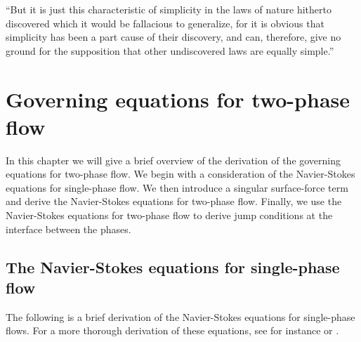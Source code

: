 \documentclass[11pt,b5paper,DIV=calc,BCOR1.3cm,headings=small,%
               footinclude=false,headsepline]{scrbook}
\begin{document}
\begin{savequote}[8.4cm]
  ``But it is just this characteristic of simplicity in the laws of nature
  hitherto discovered which it would be fallacious to generalize, for it is
  obvious that simplicity has been a part cause of their discovery, and can,
  therefore, give no ground for the supposition that other undiscovered laws
  are equally simple.''
\end{savequote}
\chapter{Governing equations for two-phase flow}
\label{chap:two-phase-flow}
In this chapter we will give a brief overview of the derivation of the
governing equations for two-phase flow.  We begin with a consideration of the
Navier-Stokes equations for single-phase flow.  We then introduce a singular
surface-force term and derive the Navier-Stokes equations for two-phase flow.
Finally, we use the Navier-Stokes equations for two-phase flow to derive jump
conditions at the interface between the phases.

\section{The Navier-Stokes equations for single-phase flow}
The following is a brief derivation of the Navier-Stokes equations for
single-phase flows.  For a more thorough derivation of these equations, see for
instance \citet[§4 and §5]{Aris89} or \citet[Chapter~4]{White03}.
\end{document}
